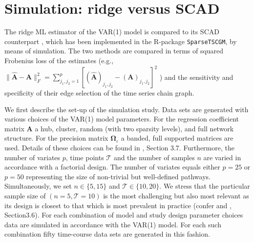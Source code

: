 \section{Simulation: ridge versus SCAD}
The ridge ML estimator of the VAR(1) model is compared to its SCAD counterpart \citep{Abegaz2013}, which has been implemented in the R-package {\tt SparseTSCGM}, by means of simulation. The two methods are compared in terms of squared Frobenius loss of the estimates (e.g., $\| \hat{\mathbf{A}} - \mathbf{A} \|_F^2   = \sum_{j_1, j_2=1}^p [(\hat{\mathbf{A}})_{j_1, j_2} - (\mathbf{A})_{j_1, j_2}]^2$ )  and the sensitivity and specificity of their edge selection of the time series chain graph.

We first describe the set-up of the simulation study. Data sets are generated with various choices of the VAR(1) model parameters. For the regression coefficient matrix $\mathbf{A}$ a hub, cluster, random (with two sparsity levels), and full network structure. For the precision matrix $\mathbf{\Omega}_{\varepsilon}$ a banded, full supported matrices are used. Details of these choices can be found in \cite{Supp2018}, Section 3.7. Furthermore, the number of variates $p$, time points $\mathcal{T}$ and the number of samples $n$ are varied in accordance with a factorial design. The number of variates equals either $p=25$ or $p=50$ representing the size of non-trivial but well-defined pathways. Simultaneously, we set $n \in \{5, 15\}$ and $\mathcal{T} \in \{10, 20\}$. We stress that the particular sample size of $(n=5, \mathcal{T}=10)$ is the most challenging but also most relevant as its design is closest to that which is most prevalent in practice (confer \cite{Ernst2005} and \cite{Supp2018}, Section3.6). For each combination of model and study design parameter choices data are simulated in accordance with the VAR(1) model. For each such combination fifty time-course data sets are generated in this fashion.

